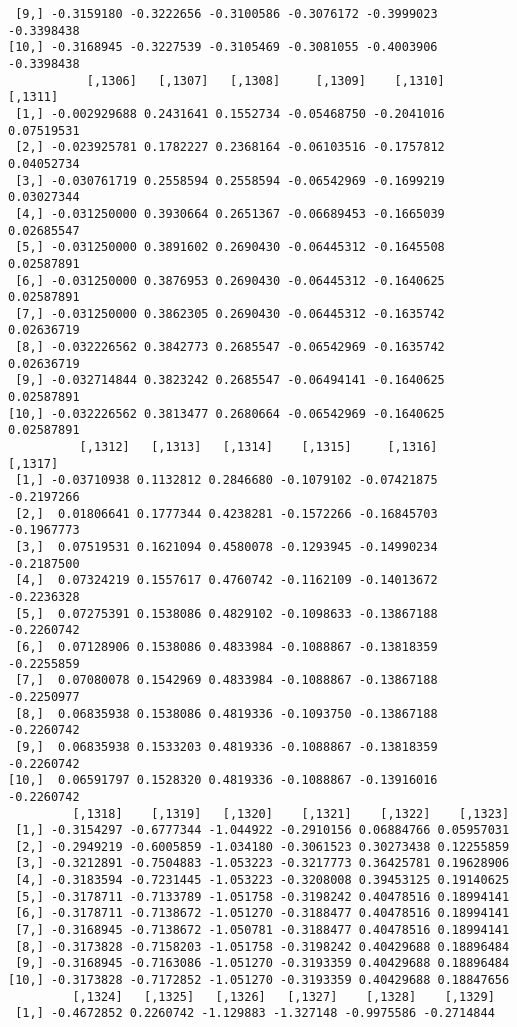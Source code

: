 \documentclass[
  letterpaper,
  DIV=11,
  numbers=noendperiod]{scrreprt}
\begin{document}
\begin{verbatim}
 [9,] -0.3159180 -0.3222656 -0.3100586 -0.3076172 -0.3999023 -0.3398438
[10,] -0.3168945 -0.3227539 -0.3105469 -0.3081055 -0.4003906 -0.3398438
           [,1306]   [,1307]   [,1308]     [,1309]    [,1310]    [,1311]
 [1,] -0.002929688 0.2431641 0.1552734 -0.05468750 -0.2041016 0.07519531
 [2,] -0.023925781 0.1782227 0.2368164 -0.06103516 -0.1757812 0.04052734
 [3,] -0.030761719 0.2558594 0.2558594 -0.06542969 -0.1699219 0.03027344
 [4,] -0.031250000 0.3930664 0.2651367 -0.06689453 -0.1665039 0.02685547
 [5,] -0.031250000 0.3891602 0.2690430 -0.06445312 -0.1645508 0.02587891
 [6,] -0.031250000 0.3876953 0.2690430 -0.06445312 -0.1640625 0.02587891
 [7,] -0.031250000 0.3862305 0.2690430 -0.06445312 -0.1635742 0.02636719
 [8,] -0.032226562 0.3842773 0.2685547 -0.06542969 -0.1635742 0.02636719
 [9,] -0.032714844 0.3823242 0.2685547 -0.06494141 -0.1640625 0.02587891
[10,] -0.032226562 0.3813477 0.2680664 -0.06542969 -0.1640625 0.02587891
          [,1312]   [,1313]   [,1314]    [,1315]     [,1316]    [,1317]
 [1,] -0.03710938 0.1132812 0.2846680 -0.1079102 -0.07421875 -0.2197266
 [2,]  0.01806641 0.1777344 0.4238281 -0.1572266 -0.16845703 -0.1967773
 [3,]  0.07519531 0.1621094 0.4580078 -0.1293945 -0.14990234 -0.2187500
 [4,]  0.07324219 0.1557617 0.4760742 -0.1162109 -0.14013672 -0.2236328
 [5,]  0.07275391 0.1538086 0.4829102 -0.1098633 -0.13867188 -0.2260742
 [6,]  0.07128906 0.1538086 0.4833984 -0.1088867 -0.13818359 -0.2255859
 [7,]  0.07080078 0.1542969 0.4833984 -0.1088867 -0.13867188 -0.2250977
 [8,]  0.06835938 0.1538086 0.4819336 -0.1093750 -0.13867188 -0.2260742
 [9,]  0.06835938 0.1533203 0.4819336 -0.1088867 -0.13818359 -0.2260742
[10,]  0.06591797 0.1528320 0.4819336 -0.1088867 -0.13916016 -0.2260742
         [,1318]    [,1319]   [,1320]    [,1321]    [,1322]    [,1323]
 [1,] -0.3154297 -0.6777344 -1.044922 -0.2910156 0.06884766 0.05957031
 [2,] -0.2949219 -0.6005859 -1.034180 -0.3061523 0.30273438 0.12255859
 [3,] -0.3212891 -0.7504883 -1.053223 -0.3217773 0.36425781 0.19628906
 [4,] -0.3183594 -0.7231445 -1.053223 -0.3208008 0.39453125 0.19140625
 [5,] -0.3178711 -0.7133789 -1.051758 -0.3198242 0.40478516 0.18994141
 [6,] -0.3178711 -0.7138672 -1.051270 -0.3188477 0.40478516 0.18994141
 [7,] -0.3168945 -0.7138672 -1.050781 -0.3188477 0.40478516 0.18994141
 [8,] -0.3173828 -0.7158203 -1.051758 -0.3198242 0.40429688 0.18896484
 [9,] -0.3168945 -0.7163086 -1.051270 -0.3193359 0.40429688 0.18896484
[10,] -0.3173828 -0.7172852 -1.051270 -0.3193359 0.40429688 0.18847656
         [,1324]   [,1325]   [,1326]   [,1327]    [,1328]    [,1329]
 [1,] -0.4672852 0.2260742 -1.129883 -1.327148 -0.9975586 -0.2714844

\end{verbatim}
\end{document}
